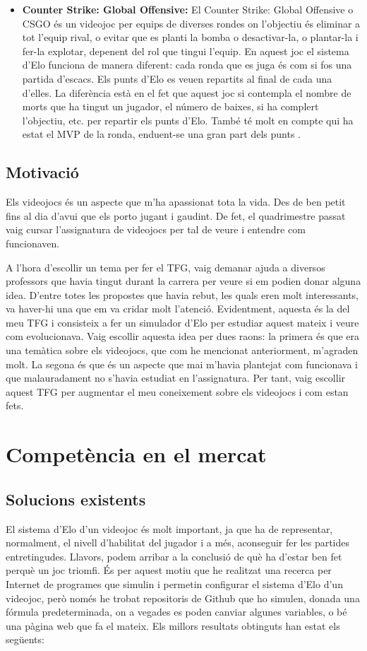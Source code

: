 \documentclass[a4paper]{article}
\begin{document}
\begin{itemize}
    \item \textbf{Counter Strike: Global Offensive:} El Counter Strike: Global Offensive o CSGO és un videojoc per equips de diverses rondes on l'objectiu és eliminar a tot l'equip rival, o evitar que es planti la bomba o desactivar-la, o plantar-la i fer-la explotar, depenent del rol que tingui l'equip.  En aquest joc el sistema d'Elo funciona de manera diferent: cada ronda que es juga és com si fos una partida d'escacs. Els punts d'Elo es veuen repartits al final de cada una d'elles. La diferència està en el fet que aquest joc si contempla el nombre de morts que ha tingut un jugador, el número de baixes, si ha complert l'objectiu, etc. per repartir els punts d'Elo. També té molt en compte qui ha estat el MVP de la ronda, enduent-se una gran part dels punts \cite{csgoELO1} \cite{csgoELO2}. 
\end{itemize}

\newpage
\subsection{Motivació}
Els videojocs és un aspecte que m'ha apassionat tota la vida. Des de ben petit fins al dia d'avui que els porto jugant i gaudint. De fet, el quadrimestre passat vaig cursar l'assignatura de videojocs per tal de veure i entendre com funcionaven.

A l'hora d'escollir un tema per fer el TFG, vaig demanar ajuda a diversos professors que havia tingut durant la carrera per veure si em podien donar alguna idea. D'entre totes les propostes que havia rebut, les quals eren molt interessants, va haver-hi una que em va cridar molt l'atenció. Evidentment, aquesta és la del meu TFG i consisteix a fer un simulador d'Elo per estudiar aquest mateix i veure com evolucionava. Vaig escollir aquesta idea per dues raons: la primera és que era una temàtica sobre els videojocs, que com he mencionat anteriorment, m'agraden molt. La segona és que és un aspecte que mai m'havia plantejat com funcionava i que malauradament no s'havia estudiat en l'assignatura. Per tant, vaig escollir aquest TFG per augmentar el meu coneixement sobre els videojocs i com estan fets.


\newpage
\section{Competència en el mercat}
\subsection{Solucions existents}
El sistema d'Elo d'un videojoc és molt important, ja que ha de representar, normalment, el nivell d'habilitat del jugador i a més, aconseguir fer les partides entretingudes. Llavors, podem arribar a la conclusió de què ha d'estar ben fet perquè un joc triomfi. És per aquest motiu que he realitzat una recerca per Internet de programes que simulin i permetin configurar el sistema d'Elo d'un videojoc, però només he trobat repositoris de Github que ho simulen, donada una fórmula predeterminada, on a vegades es poden canviar algunes variables, o bé una pàgina web que fa el mateix. Els millors resultats obtinguts han estat els següents:
\end{document}
